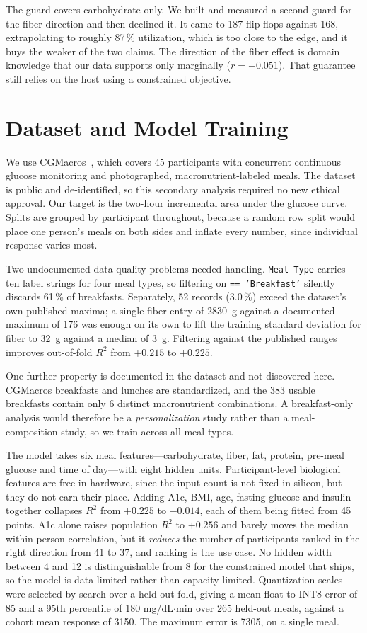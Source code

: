 \documentclass[conference]{IEEEtran}
\begin{document}
The guard covers carbohydrate only. We built and measured a second guard for
the fiber direction and then declined it. It came to 187 flip-flops against
168, extrapolating to roughly 87\,\% utilization, which is too close to the
edge, and it buys the weaker of the two claims. The direction of the fiber
effect is domain knowledge that our data supports only marginally
($r=-0.051$). That guarantee still relies on the host using a constrained
objective.

\section{Dataset and Model Training}

We use CGMacros~\cite{cgmacros}, which covers 45 participants with concurrent
continuous glucose monitoring and photographed, macronutrient-labeled meals.
The dataset is public and de-identified, so this secondary analysis required no
new ethical approval. Our target is the two-hour incremental area under the
glucose curve. Splits are grouped by participant throughout, because a random
row split would place one person's meals on both sides and inflate every
number, since individual response varies most.

Two undocumented data-quality problems needed handling. \texttt{Meal Type}
carries ten label strings for four meal types, so filtering on
\texttt{== 'Breakfast'} silently discards 61\,\% of breakfasts. Separately, 52
records (3.0\,\%) exceed the dataset's own published maxima; a single fiber
entry of 2830~g against a documented maximum of 176 was enough on its own to
lift the training standard deviation for fiber to 32~g against a median of
3~g. Filtering against the published ranges improves out-of-fold $R^2$ from
$+0.215$ to $+0.225$.

One further property is documented in the dataset and not discovered here.
CGMacros breakfasts and lunches are standardized, and the 383 usable breakfasts
contain only 6 distinct macronutrient combinations. A breakfast-only analysis
would therefore be a \emph{personalization} study rather than a
meal-composition study, so we train across all meal types.

The model takes six meal features---carbohydrate, fiber, fat, protein, pre-meal
glucose and time of day---with eight hidden units. Participant-level biological
features are free in hardware, since the input count is not fixed in silicon,
but they do not earn their place. Adding A1c, BMI, age, fasting glucose and
insulin together collapses $R^2$ from $+0.225$ to $-0.014$, each of them being
fitted from 45 points. A1c alone raises population $R^2$ to $+0.256$ and barely
moves the median within-person correlation, but it \emph{reduces} the number of
participants ranked in the right direction from 41 to 37, and ranking is the
use case. No hidden width between 4 and 12 is distinguishable from 8 for the
constrained model that ships, so the model is data-limited rather than
capacity-limited. Quantization scales were selected by search over a held-out
fold, giving a mean float-to-INT8 error of 85 and a 95th percentile of 180
mg/dL$\cdot$min over 265 held-out meals, against a cohort mean response of
3150. The maximum error is 7305, on a single meal.
\end{document}
